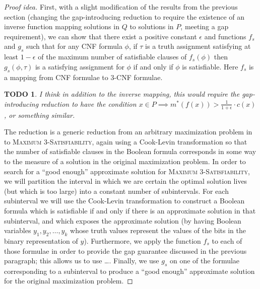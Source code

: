 \documentclass[]{article}
\theoremstyle{plain}
\newtheorem{todo}{TODO}
\theoremstyle{definition}
\newenvironment{proofidea}{\begin{proof}[Proof idea]}{\end{proof}}
\begin{document}
\begin{proofidea}
  First, with a slight modification of the results from the previous section (changing the gap-introducing reduction to require the existence of an inverse function mapping solutions in $Q$ to solutions in $P$, meeting a gap requirement), we can show that there exist a positive constant $\epsilon$ and functions $f_s$ and $g_s$ such that for any CNF formula $\phi$, if $\tau$ is a truth assignment satisfying at least $1 - \epsilon$ of the maximum number of satisfiable clauses of $f_s(\phi)$ then $g_s(\phi, \tau)$ is a satisfying assignment for $\phi$ if and only if $\phi$ is satisfiable.
  Here $f_s$ is a mapping from CNF formulae to 3-CNF formulae.
  \begin{todo}
    I think in addition to the inverse mapping, this would require the gap-introducing reduction to have the condition $x \in P \implies m^*(f(x)) > \frac{1}{1 + \epsilon} \cdot c(x)$, or something similar.
  \end{todo}

  The reduction is a generic reduction from an arbitrary maximization problem in \APX{} to \textsc{Maximum 3-Satisfiability}, again using a Cook-Levin transformation so that the number of satisfiable clauses in the Boolean formula corresponds in some way to the measure of a solution in the original maximization problem.
  In order to search for a ``good enough'' approximate solution for \textsc{Maximum 3-Satisfiability}, we will partition the interval in which we are certain the optimal solution lives (but which is too large) into a constant number of subintervals.
  For each subinterval we will use the Cook-Levin transformation to construct a Boolean formula which is satisfiable if and only if there is an approximate solution in that subinterval, and which exposes the approximate solution (by having Boolean variables $y_1, y_2, \dotsc, y_k$ whose truth values represent the values of the bits in the binary representation of $y$).
  Furthermore, we apply the function $f_s$ to each of those formulae in order to provide the gap guarantee discussed in the previous paragraph; this allows us to use \ldots.
  Finally, we use $g_s$ on one of the formulae corresponding to a subinterval to produce a ``good enough'' approximate solution for the original maximization problem.
\end{proofidea}
\end{document}
